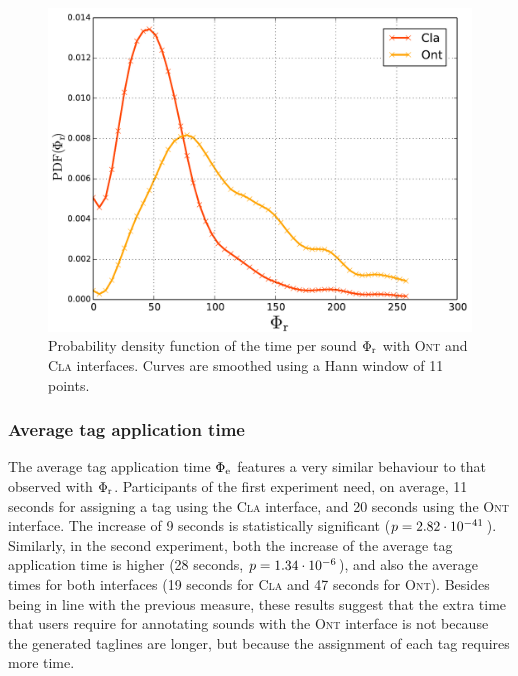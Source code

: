 \begin{figure}[t]
  \centering
  \includegraphics[width=\figSizeMidLarge]{ch06_ontology/pics/time_per_sound_pdf}
  \caption[Probability density function of the time per sound]{Probability density function of the time per sound $\Phi_{\text{r}}$ with \textsc{Ont} and \textsc{Cla} interfaces. Curves are smoothed using a Hann window of 11 points.}
  \label{fig:ontology:time_per_sound}
\end{figure}

\subsubsection{Average tag application time}



The average tag application time $\Phi_{\text{e}}$ features a very similar behaviour to that observed with $\Phi_{\text{r}}$.
Participants of the first experiment need, on average, 11 seconds for assigning a tag using the \textsc{Cla} interface, and 20 seconds using the \textsc{Ont} interface. The increase of 9 seconds is statistically significant ($p = 2.82\cdot 10^{-41}$).
Similarly, in the second experiment, both the increase of the average tag application time is higher (28 seconds, $p = 1.34\cdot 10^{-6}$), and also the average times for both interfaces (19 seconds for \textsc{Cla} and 47 seconds for \textsc{Ont}).
Besides being in line with the previous measure, these results suggest that the extra time that users require for annotating sounds with the \textsc{Ont} interface is not because the generated taglines are longer, but because the assignment of each tag requires more time. 



